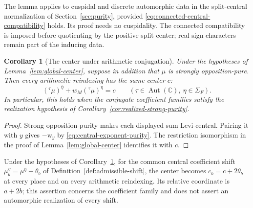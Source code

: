 \documentclass[12pt]{amsart}
\numberwithin{equation}{section}
\theoremstyle{plain}
\newtheorem{corollary}[theorem]{Corollary}
\theoremstyle{definition}
\theoremstyle{remark}
\renewcommand{\bar}{\overline}
\begin{document}
The lemma applies to cuspidal and discrete automorphic data in the split-central normalization of Section~\ref{sec:purity}, provided \eqref{eq:connected-central-compatibility} holds. Its proof needs no cuspidality. The connected compatibility is imposed before quotienting by the positive split center; real sign characters remain part of the inducing data.

\begin{corollary}[The center under arithmetic conjugation] \label{cor:arithmetic-common-center}
Under the hypotheses of Lemma~\ref{lem:global-center}, suppose in addition that $\mu$ is strongly opposition-pure. Then every arithmetic reindexing has the same center $c$:
\[
 ({}^{\tau}\mu)^{\bar\eta}+w_M({}^{\tau}\mu)^\eta=c
 \qquad(\tau\in\operatorname{Aut}(\mathbb C),\ \eta\in\Sigma_F).
\]
In particular, this holds when the conjugate coefficient families satisfy the realization hypothesis of Corollary~\ref{cor:realized-strong-purity}. 
\end{corollary}

\begin{proof}
Strong opposition-purity makes each displayed sum Levi-central. Pairing it with $y$ gives $-\mathrm{w}_y$ by \eqref{eq:central-exponent-purity}. The restriction isomorphism in the proof of Lemma~\ref{lem:global-center} identifies it with $c$. 
\end{proof}

Under the hypotheses of Corollary~\ref{cor:arithmetic-common-center}, for the common central coefficient shift $\mu_b^\eta=\mu^\eta+\theta_b$ of Definition~\ref{def:admissible-shift}, the center becomes $c_b=c+2\theta_b$ at every place and on every arithmetic reindexing. Its relative coordinate is $a+2b$; this assertion concerns the coefficient family and does not assert an automorphic realization of every shift.
\end{document}
